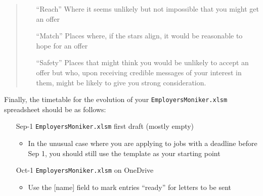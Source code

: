 \documentclass{\classes/econtex}
\begin{document}
\begin{quote}
\begin{enumerate}
\item[``Reach''] Where it seems unlikely but not impossible that you might get an offer
\item[``Match''] Places where, if the stars align, it would be reasonable to hope for an offer
  \item[``Safety''] Places that might think you would be unlikely to accept an offer but who, upon receiving credible messages of your interest in them, might be likely to give you strong consideration.
  \end{enumerate}
  \end{quote}

  Finally, the timetable for the evolution of your \texttt{EmployersMoniker.xlsm} spreadsheet should be as follows:
\hypertarget{employers-list-timetable}{}  
\begin{enumerate}
\item[Sep-1] \texttt{EmployersMoniker.xlsm} first draft (mostly empty)
  \begin{itemize}
  \item In the unusual case where you are applying to jobs with a deadline before Sep 1, you should still use the {\Employers} template as your starting point
  \end{itemize}
\item[Oct-1] \texttt{EmployersMoniker.xlsm} on OneDrive
  \begin{itemize}
  \item Use the [name] field to mark entries ``ready'' for letters to be sent
  \end{itemize} 
\end{enumerate}


\pagebreak
\end{document}
